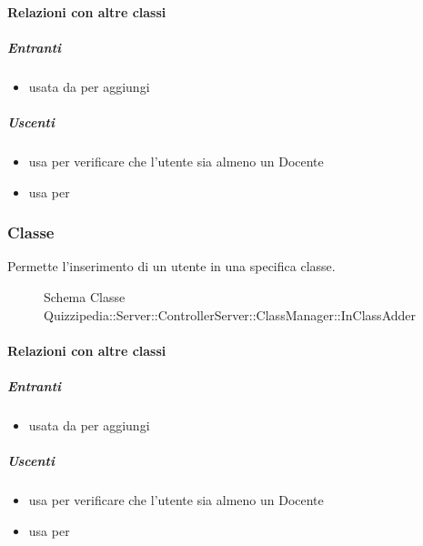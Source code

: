 \paragraph{Relazioni con altre classi}
\subparagraph{Entranti}
\begin{itemize}
\item usata da  per aggiungi
\end{itemize}
\subparagraph{Uscenti}
\begin{itemize}
\item usa  per verificare che l'utente sia almeno un Docente
\item usa  per 
\end{itemize}
\subsubsection{Classe }
Permette l'inserimento di un utente in una specifica classe.
\begin{figure}[H]
\centering
\noindent{}
\caption[Schema Classe InClassAdder]{Schema Classe Quizzipedia::Server::ControllerServer::ClassManager::InClassAdder}
\end{figure}
\paragraph{Relazioni con altre classi}
\subparagraph{Entranti}
\begin{itemize}
\item usata da  per aggiungi
\end{itemize}
\subparagraph{Uscenti}
\begin{itemize}
\item usa  per verificare che l'utente sia almeno un Docente
\item usa  per 
\end{itemize}
